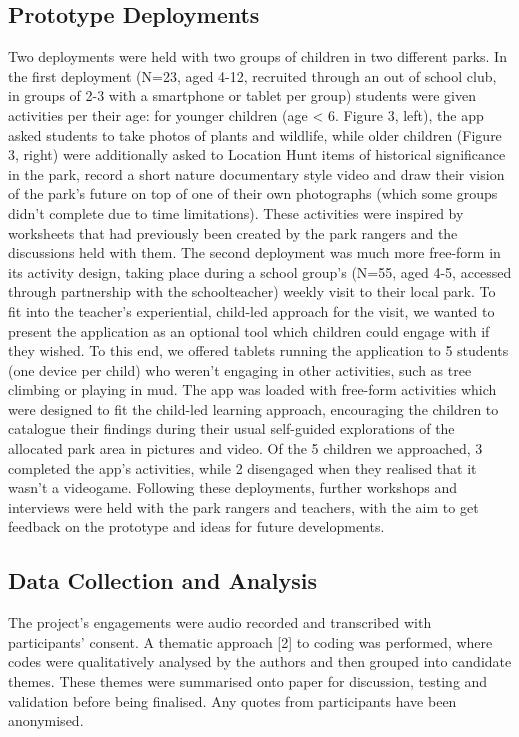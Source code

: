 \subsection{Prototype Deployments}

Two deployments were held with two groups of children in two different parks. In the first deployment (N=23, aged 4-12, recruited through an out of school club, in groups of 2-3 with a smartphone or tablet per group) students were given activities per their age: for younger children (age < 6. Figure 3, left), the app asked students to take photos of plants and wildlife, while older children (Figure 3, right) were additionally asked to Location Hunt items of historical significance in the park, record a short nature documentary style video and draw their vision of the park’s future on top of one of their own photographs (which some groups didn’t complete due to time limitations). These activities were inspired by worksheets that had previously been created by the park rangers and the discussions held with them. 
The second deployment was much more free-form in its activity design, taking place during a school group’s (N=55, aged 4-5, accessed through partnership with the schoolteacher) weekly visit to their local park. To fit into the teacher’s experiential, child-led approach for the visit, we wanted to present the application as an optional tool which children could engage with if they wished. To this end, we offered tablets running the application to 5 students (one device per child) who weren’t engaging in other activities, such as tree climbing or playing in mud. The app was loaded with free-form activities which were designed to fit the child-led learning approach, encouraging the children to catalogue their findings during their usual self-guided explorations of the allocated park area in pictures and video. Of the 5 children we approached, 3 completed the app’s activities, while 2 disengaged when they realised that it wasn’t a videogame.
Following these deployments, further workshops and interviews were held with the park rangers and teachers, with the aim to get feedback on the prototype and ideas for future developments.

\subsection{Data Collection and Analysis}

The project’s engagements were audio recorded and transcribed with participants’ consent. A thematic approach [2] to coding was performed, where codes were qualitatively analysed by the authors and then grouped into candidate themes. These themes were summarised onto paper for discussion, testing and validation before being finalised. Any quotes from participants have been anonymised.

